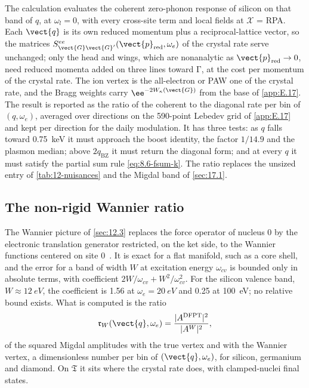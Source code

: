 The calculation evaluates the coherent zero-phonon response of silicon on that band of $q$, at $\omega_l = 0$, with every cross-site term and local fields at $\mathcal{X}$ = RPA. Each $\vect{q}$ is its own reduced momentum plus a reciprocal-lattice vector, so the matrices $S^{ee}_{\vect{G}\vect{G}'}(\vect{p}_{\mathrm{red}},\omega_e)$ of the crystal rate serve unchanged; only the head and wings, which are nonanalytic as $\vect{p}_{\mathrm{red}}\to0$, need reduced momenta added on three lines toward $\mathrm{\Gamma}$, at the cost per momentum of the crystal rate. The ion vertex is the all-electron or PAW one of the crystal rate, and the Bragg weights carry $\ee^{-2W_\kappa(\vect{G})}$ from the base of \cref{app:E.17}. The result is reported as the ratio of the coherent to the diagonal rate per bin of $(q,\omega_e)$, averaged over directions on the 590-point Lebedev grid of \cref{app:E.17} and kept per direction for the daily modulation. It has three tests: as $q$ falls toward \SI{0.75}{keV} it must approach the boost identity, the factor $1/14.9$ and the plasmon median; above $2q_{\mathrm{BZ}}$ it must return the diagonal form; and at every $q$ it must satisfy the partial sum rule \cref{eq:8.6-fsum-k}. The ratio replaces the unsized entry of \cref{tab:12-nuisances} and the Migdal band of \cref{sec:17.1}.

\subsection{The non-rigid Wannier ratio}

The Wannier picture of \cref{sec:12.3} replaces the force operator of nucleus 0 by the electronic translation generator restricted, on the ket side, to the Wannier functions centered on site 0~\cite{liang2020describing}. It is exact for a flat manifold, such as a core shell, and the error for a band of width $W$ at excitation energy $\omega_{cv}$ is bounded only in absolute terms, with coefficient $2W/\omega_{cv} + W^2/\omega_{cv}^2$. For the silicon valence band, $W \approx \SI{12}{eV}$, the coefficient is 1.56 at $\omega_e = \SI{20}{eV}$ and 0.25 at \SI{100}{eV}; no relative bound exists. What is computed is the ratio
\begin{equation}
  \mathfrak{r}_W(\vect{q},\omega_e) = \frac{|A^{\mathrm{DFPT}}|^2}{|A^{W}|^2} ,
  \label{eq:E.18-rW}
\end{equation}
of the squared Migdal amplitudes with the true vertex and with the Wannier vertex, a dimensionless number per bin of $(\vect{q},\omega_e)$, for silicon, germanium and diamond. On $\mathfrak{T}$ it sits where the crystal rate does, with clamped-nuclei final states.

